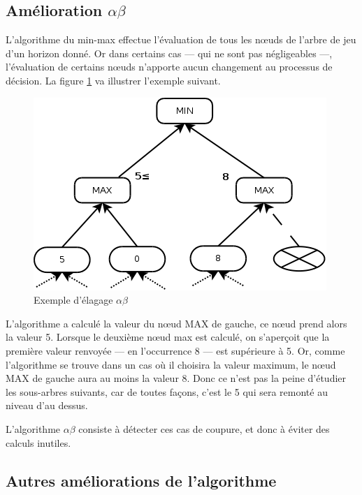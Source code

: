 \documentclass[11pt,a4paper,titlepage,french]{article}
\begin{document}
		\subsection[Amélioration]{Amélioration $\alpha\beta$}

				L'algorithme du min-max effectue l'évaluation de tous les nœuds de l'arbre de jeu d'un horizon donné. Or dans certains cas --- qui ne sont pas négligeables ---, l'évaluation de certains nœuds n'apporte aucun changement au processus de décision. La figure \ref{abex} va illustrer l'exemple suivant.

				\begin{figure}[hbt]
					\label{abex}
					\begin{center}
						\includegraphics[width=\textwidth]{./alphabeta.png}
					\end{center}
					\caption{Exemple d'élagage $\alpha\beta$}
				\end{figure}

				L'algorithme a calculé la valeur du nœud MAX de gauche, ce nœud prend alors la valeur 5. Lorsque le deuxième nœud max est calculé, on s'aperçoit que la première valeur renvoyée --- en l'occurrence 8 --- est supérieure à 5. Or, comme l'algorithme se trouve dans un cas où il choisira la valeur maximum, le nœud MAX de gauche aura au moins la valeur 8. Donc ce n'est pas la peine d'étudier les sous-arbres suivants, car de toutes façons, c'est le 5 qui sera remonté au niveau d'au dessus.

				L'algorithme $\alpha\beta$ consiste à détecter ces cas de coupure, et donc à éviter des calculs inutiles.


		\subsection{Autres améliorations de l'algorithme}
\end{document}
